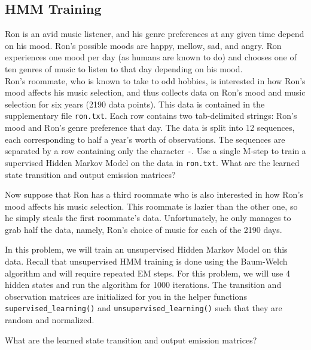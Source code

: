 \begin{solution}
\end{solution}

\subsection{HMM Training}
Ron is an avid music listener, and his genre preferences at any given time depend on his mood. Ron's possible moods are happy, mellow, sad, and angry. Ron experiences one mood per day (as humans are known to do) and chooses one of ten genres of music to listen to that day depending on his mood. \\

Ron's roommate, who is known to take to odd hobbies, is interested in how Ron's mood affects his music selection, and thus collects data on Ron's mood and music selection for six years (2190 data points). This data is contained in the supplementary file \texttt{ron.txt}. Each row contains two tab-delimited strings: Ron's mood and Ron's genre preference that day. The data is split into 12 sequences, each corresponding to half a year's worth of observations. The sequences are separated by a row containing only the character \texttt{-}.
\noindent\problem[10] %
Use a single M-step to train a supervised Hidden Markov Model on the data in \texttt{ron.txt}. What are the learned state transition and output emission matrices?


\begin{solution}
\end{solution}
\indent\problem[15] %
Now suppose that Ron has a third roommate who is also interested in how Ron's mood affects his music selection. This roommate is lazier than the other one, so he simply steals the first roommate's data. Unfortunately, he only manages to grab half the data, namely, Ron's choice of music for each of the 2190 days.

In this problem, we will train an unsupervised Hidden Markov Model on this data. Recall that unsupervised HMM training is done using the Baum-Welch algorithm and will require repeated EM steps. For this problem, we will use 4 hidden states and run the algorithm for 1000 iterations. The transition and observation matrices are initialized for you in the helper functions \texttt{supervised\_learning()} and \texttt{unsupervised\_learning()} such that they are random and normalized.

What are the learned state transition and output emission matrices?

